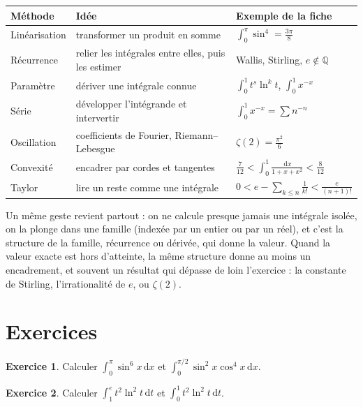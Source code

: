 \documentclass[11pt,a4paper]{article}
\theoremstyle{plain}
\theoremstyle{definition}
\newtheorem{exercice}{Exercice}
\theoremstyle{remark}
\newcommand{\Q}{\mathbb{Q}}
\newcommand{\dd}{\,\mathrm{d}}
\begin{document}
\begin{center}
\renewcommand{\arraystretch}{1.25}
\begin{tabular}{@{}p{2.6cm}p{6cm}p{6.2cm}@{}}
\toprule
\textbf{Méthode} & \textbf{Idée} & \textbf{Exemple de la fiche} \\
\midrule
Linéarisation & transformer un produit en somme & $\int_0^\pi\sin^4=\frac{3\pi}8$ \\
Récurrence & relier les intégrales entre elles, puis les estimer & Wallis, Stirling, $e\notin\Q$ \\
Paramètre & dériver une intégrale connue & $\int_0^1t^s\ln^kt$, $\int_0^1x^{-x}$ \\
Série & développer l'intégrande et intervertir & $\int_0^1x^{-x}=\sum n^{-n}$ \\
Oscillation & coefficients de Fourier, Riemann--Lebesgue & $\zeta(2)=\frac{\pi^2}6$ \\
Convexité & encadrer par cordes et tangentes & $\frac7{12}<\int_0^1\frac{\dd x}{1+x+x^2}<\frac8{12}$ \\
Taylor & lire un reste comme une intégrale & $0<e-\sum_{k\leq n}\frac1{k!}<\frac e{(n+1)!}$ \\
\bottomrule
\end{tabular}
\end{center}

Un même geste revient partout : on ne calcule presque jamais une intégrale isolée, on la plonge dans une famille (indexée par un entier ou par un réel), et c'est la structure de la famille, récurrence ou dérivée, qui donne la valeur. Quand la valeur exacte est hors d'atteinte, la même structure donne au moins un encadrement, et souvent un résultat qui dépasse de loin l'exercice : la constante de Stirling, l'irrationalité de $e$, ou $\zeta(2)$.

\section{Exercices}

\begin{exercice}
Calculer $\displaystyle\int_0^\pi\sin^6x\dd x$ et $\displaystyle\int_0^{\pi/2}\sin^2x\cos^4x\dd x$.
\end{exercice}

\begin{exercice}
Calculer $\displaystyle\int_1^e t^2\ln^2t\dd t$ et $\displaystyle\int_0^1t^2\ln^2t\dd t$.
\end{exercice}
\end{document}
